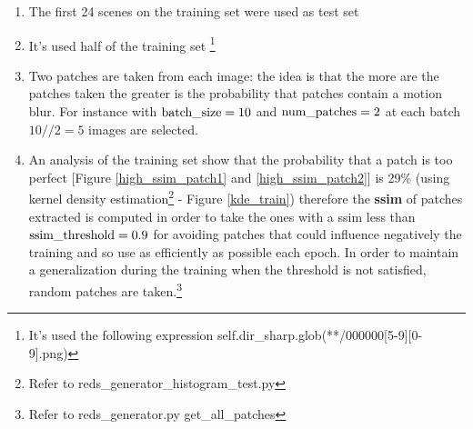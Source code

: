 \begin{enumerate}
    \item The first 24 scenes on the training set were used as test set
    \item It's used half of the training set \footnote{It's used the following expression self.dir\_sharp.glob(**/000000[5-9][0-9].png)}
    \item Two patches are taken from each image: the idea is that the more are the patches taken the greater is the probability that patches contain a motion blur. For instance with $\textnormal{batch\_size}=10$ and $\textnormal{num\_patches}=2$ at each batch $10//2=5$ images are selected.
    \item An analysis of the training set show that the probability that a patch is too perfect [Figure \ref{high_ssim_patch1} and \ref{high_ssim_patch2}] is 29\% (using kernel density estimation\footnote{Refer to reds\_generator\_histogram\_test.py} - Figure \ref{kde_train}) therefore the \textbf{ssim} of patches extracted is computed in order to take the ones with a ssim less than $\textnormal{ssim\_threshold} = 0.9$ for avoiding patches that could influence negatively the training and so use as efficiently as possible each epoch.
    In order to maintain a generalization during the training when the threshold is not satisfied, random patches are taken.\footnote{Refer to reds\_generator.py get\_all\_patches}


\end{enumerate}
